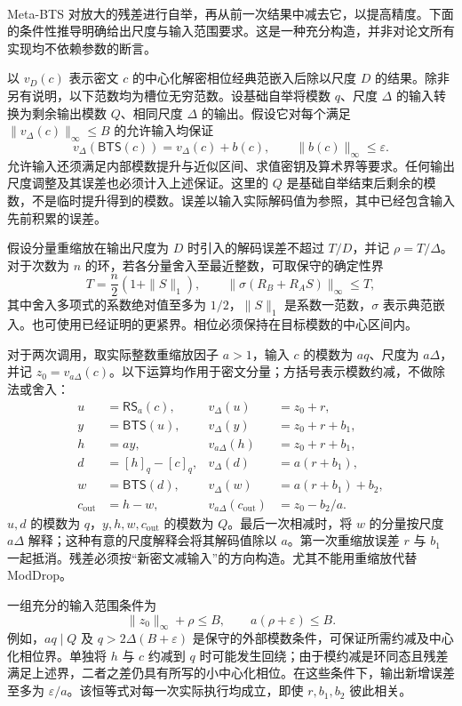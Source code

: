 $ $

 Meta-BTS 对放大的残差进行自举，再从前一次结果中减去它，以提高精度。下面的条件性推导明确给出尺度与输入范围要求。这是一种充分构造，并非对论文所有实现均不依赖参数的断言。

以 $v_D(c)$ 表示密文 $c$ 的中心化解密相位经典范嵌入后除以尺度 $D$ 的结果。除非另有说明，以下范数均为槽位无穷范数。设基础自举将模数 $q$、尺度 $\Delta$ 的输入转换为剩余输出模数 $Q$、相同尺度 $\Delta$ 的输出。假设它对每个满足 $\|v_\Delta(c)\|_\infty\leq B$ 的允许输入均保证
\[
v_\Delta(\mathsf{BTS}(c))=v_\Delta(c)+b(c),
\qquad \|b(c)\|_\infty\leq\varepsilon.
\]
允许输入还须满足内部模数提升与近似区间、求值密钥及算术界等要求。任何输出尺度调整及其误差也必须计入上述保证。这里的 $Q$ 是基础自举结束后剩余的模数，不是临时提升得到的模数。误差以输入实际解码值为参照，其中已经包含输入先前积累的误差。

假设分量重缩放在输出尺度为 $D$ 时引入的解码误差不超过 $T/D$，并记 $\rho=T/\Delta$。对于次数为 $n$ 的环，若各分量舍入至最近整数，可取保守的确定性界
\[
T=\frac{n}{2}(1+\|S\|_1),
\qquad
\|\sigma(R_B+R_AS)\|_\infty\leq T,
\]
其中舍入多项式的系数绝对值至多为 $1/2$，$\|S\|_1$ 是系数一范数，$\sigma$ 表示典范嵌入。也可使用已经证明的更紧界。相位必须保持在目标模数的中心区间内。

对于两次调用，取实际整数重缩放因子 $a>1$，输入 $c$ 的模数为 $aq$、尺度为 $a\Delta$，并记 $z_0=v_{a\Delta}(c)$。以下运算均作用于密文分量；方括号表示模数约减，不做除法或舍入：
\begin{align*}
u&=\mathsf{RS}_a(c), &v_\Delta(u)&=z_0+r,\\
y&=\mathsf{BTS}(u), &v_\Delta(y)&=z_0+r+b_1,\\
h&=ay, &v_{a\Delta}(h)&=z_0+r+b_1,\\
d&=[h]_q-[c]_q, &v_\Delta(d)&=a(r+b_1),\\
w&=\mathsf{BTS}(d), &v_\Delta(w)&=a(r+b_1)+b_2,\\
c_{\mathrm{out}}&=h-w, &v_{a\Delta}(c_{\mathrm{out}})&=z_0-b_2/a.
\end{align*}
$u,d$ 的模数为 $q$，$y,h,w,c_{\mathrm{out}}$ 的模数为 $Q$。最后一次相减时，将 $w$ 的分量按尺度 $a\Delta$ 解释；这种有意的尺度解释会将其解码值除以 $a$。第一次重缩放误差 $r$ 与 $b_1$ 一起抵消。残差必须按“新密文减输入”的方向构造。尤其不能用重缩放代替 ModDrop。

一组充分的输入范围条件为
\[
\|z_0\|_\infty+\rho\leq B,
\qquad a(\rho+\varepsilon)\leq B.
\]
例如，$aq\mid Q$ 及 $q>2\Delta(B+\varepsilon)$ 是保守的外部模数条件，可保证所需约减及中心化相位界。单独将 $h$ 与 $c$ 约减到 $q$ 时可能发生回绕；由于模约减是环同态且残差满足上述界，二者之差仍具有所写的小中心化相位。在这些条件下，输出新增误差至多为 $\varepsilon/a$。该恒等式对每一次实际执行均成立，即使 $r,b_1,b_2$ 彼此相关。

